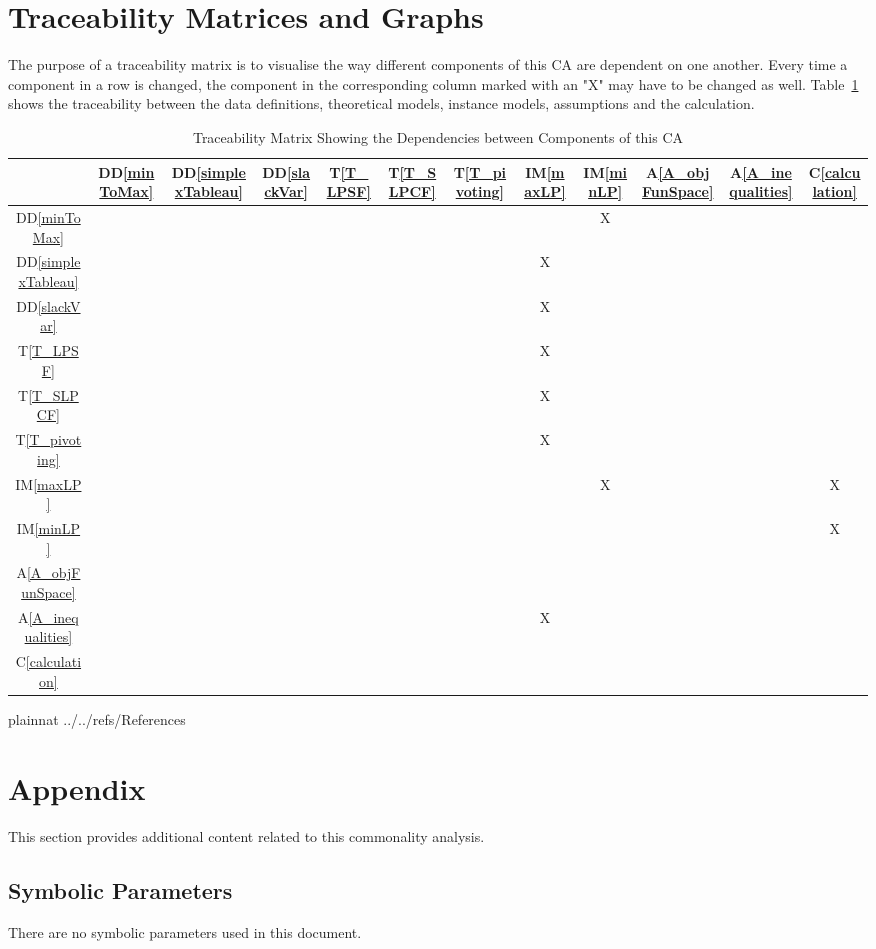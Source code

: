 \documentclass[12pt]{article}
\newcommand{\ddref}[1]{DD\ref{#1}}
\newcommand{\tref}[1]{T\ref{#1}}
\newcommand{\aref}[1]{A\ref{#1}}
\newcommand{\calcref}[1]{C\ref{#1}}
\newcommand{\iref}[1]{IM\ref{#1}}
\begin{document}
\section{Traceability Matrices and Graphs} \label{Sec_TraceabilityMatrix}

The purpose of a traceability matrix is to visualise the way different 
components of this CA are dependent on one another. Every time a component in a 
row is changed, the component in the corresponding column marked with an "X" 
may have to be changed as well.  Table~\ref{Table_traceability1} shows the 
traceability between the data definitions, theoretical models, instance models, 
assumptions and the calculation.

\begin{table}[h!]
	\centering
	\begin{tabular}{|c|c|c|c|c|c|c|c|c|c|c|c|}
		\hline        
		& \ddref{minToMax} & \ddref{simplexTableau} & \ddref{slackVar} & 
		\tref{T_LPSF} & \tref{T_SLPCF} & \tref{T_pivoting} & \iref{maxLP} & 
		\iref{minLP} & \aref{A_objFunSpace} & \aref{A_inequalities} & 
		\calcref{calculation} \\
		\hline
		\ddref{minToMax} 	    &   &   &   &   &   &   &   & X &   &   &  \\
		\hline
		\ddref{simplexTableau}  &   &   &   &   &   &   & X &   &   &   &  \\ 
		\hline
		\ddref{slackVar} 		&   &   &   &   &   &   & X &   &   &   &  \\ 
		\hline
		\tref{T_LPSF} 		  	&   &   &   &   &   &   & X &   &   &   &  \\ 
		\hline
		\tref{T_SLPCF} 	  		&   &   &   &   &   &   & X &   &   &   &  \\ 
		\hline  
		\tref{T_pivoting} 		&   &   &   &   &   &   & X &   &   &   &  \\ 
		\hline
		\iref{maxLP} 	  		&   &   &   &   &   &   &   & X &   &   & X\\ 
		\hline
		\iref{minLP}   			&   &   &   &   &   &   &   &   &   &   & X\\ 
		\hline
		\aref{A_objFunSpace}	&   &   &   &   &   &   &   &   &   &   &  \\
		\hline 
		\aref{A_inequalities} 	&   &   &   &   &   &   & X &   &   &   &  \\
		\hline
		\calcref{calculation} 	&   &   &   &   &   &   &   &   &   &   & \\
		\hline
	\end{tabular}
	\caption{Traceability Matrix Showing the Dependencies between Components of 
	this CA}
	\label{Table_traceability1}
\end{table}

\newpage

 {plainnat}
 {../../refs/References}

\newpage

\section{Appendix}

	This section provides additional content related to this commonality 
	analysis.

\subsection{Symbolic Parameters}

There are no symbolic parameters used in this document.
\end{document}

